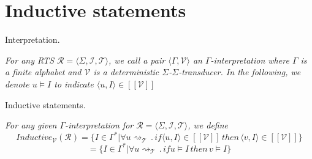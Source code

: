 \section*{Inductive statements}\label{section:inductive_statements}

\begin{definition}\label{definition:interpretation}
    Interpretation.
\end{definition}
\textit{
   For any RTS $\mathcal{R} = \langle \Sigma, \mathcal{I}, \mathcal{T} \rangle$, we call 
   a pair $\langle \Gamma, \mathcal{V} \rangle$ an $\Gamma$-\textit{interpretation}
   where $\Gamma$ is a finite alphabet and $\mathcal{V}$ is a deterministic $\Sigma$-$\Sigma$-\textit{transducer}.
   In the following, we denote $ u \models I $ to indicate $ \langle u, I \rangle \in [[\mathcal{V}]]$
}

\begin{definition}\label{definition:inductive_statements}
    Inductive statements.
\end{definition}
\textit{
   For any given $\Gamma$-\textit{interpretation} for $\mathcal{R} = \langle \Sigma, \mathcal{I}, \mathcal{T} \rangle$, we define
   \[
   Inductive_{\mathcal{V}}(\mathcal{R}) = \lbrace I \in \Gamma^* | 
   \forall u \rightsquigarrow_\mathcal{T} \, . \, if \langle u, I \rangle
   \in [[\mathcal{V}]] \, then \, \langle v, I \rangle \in [[\mathcal{V}]] \rbrace
   \]
   \[=  \lbrace I \in \Gamma^* | 
   \forall u \rightsquigarrow_\mathcal{T} \, . \, if u \models I
    \, then \, v \models I \rbrace\]
}